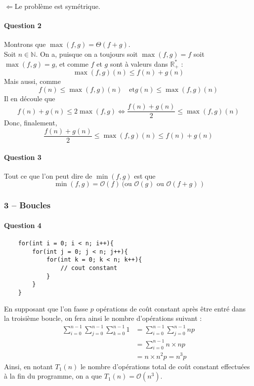 \documentclass[10pt]{article}
\def\N{\mathbb N}
\def\Rpe{\mathbb R_+^*}
\def\ssi{\Leftrightarrow}
\def\O{\mathcal{O}}
\begin{document}
    $\boxed{\Leftarrow}$\quad Le problème est symétrique.\\


    \paragraph{Question 2} Montrons que $\max(f,g)=\Theta(f+g)$.\\
    Soit $n\in\N$. On a, puisque on a toujours soit $\max(f,g)=f$ soit $\max(f,g)=g$, et comme $f$ et $g$ sont à valeurs dans $\Rpe$ : \[\max(f,g)(n)\leq f(n)+g(n)\]
    Mais aussi, comme \[f(n)\leq \max(f,g)(n)\quad \text{et} g(n)\leq \max(f,g)(n)\]
    Il en découle que \[f(n)+g(n)\leq 2\max(f,g)\ssi \frac{f(n)+g(n)}2\leq \max(f,g)(n)\]
    Donc, finalement, \[\frac{f(n)+g(n)}2\leq\max(f,g)(n) \leq f(n)+g(n)\]

    \paragraph{Question 3} Tout ce que l'on peut dire de $\min(f, g)$ est que \[\min(f,g)=\O(f)\ \text{(ou }\O(g)\text{ ou }\O(f+g)\text{ )}\]

    \subsubsection*{3 – Boucles}
    \paragraph{Question 4} 
    \begin{lstlisting}
    for(int i = 0; i < n; i++){
        for(int j = 0; j < n; j++){
            for(int k = 0; k < n; k++){
                // cout constant
            }
        }
    }
    \end{lstlisting}
    En supposant que l'on fasse $p$ opérations de coût constant après être entré dans la troisième boucle, on fera ainsi le nombre d'opérations suivant :
    \begin{align*}
        \sum_{i=0}^{n-1}\sum_{j=0}^{n-1}\sum_{k=0}^{n-1}1 &= \sum_{i=0}^{n-1}\sum_{j=0}^{n-1}np\\
                                                    &= \sum_{i=0}^{n-1}n\times np\\
                                                    &= n\times n^2p=n^3p
    \end{align*}
    Ainsi, en notant $T_1(n)$ le nombre d'opérations total de coût constant effectuées à la fin du programme, on a que $T_1(n)=\O(n^3)$.\\
\end{document}
